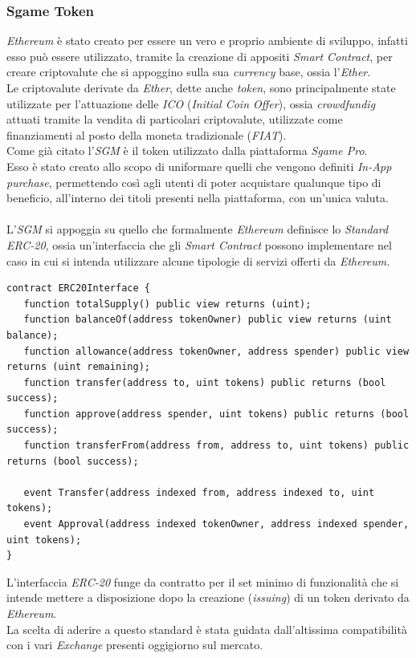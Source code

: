 \documentclass[11pt]{thesistemp}
\begin{document}
\subsubsection{Sgame Token}

\textit{Ethereum} è stato creato per essere un vero e proprio ambiente di sviluppo, infatti esso può essere utilizzato, tramite la creazione di appositi \textit{Smart Contract}, per creare criptovalute che si appoggino sulla sua \textit{currency} base, ossia l'\textit{Ether}.\\
Le criptovalute derivate da \textit{Ether}, dette anche \textit{token}, sono principalmente state utilizzate per l'attuazione delle \textit{ICO} (\textit{Initial Coin Offer}), ossia \textit{crowdfundig} attuati tramite la vendita di particolari criptovalute, utilizzate come finanziamenti al posto della moneta tradizionale (\textit{FIAT}).\\
Come già citato l'\textit{SGM} è il token utilizzato dalla piattaforma \textit{Sgame Pro}.\\
Esso è stato creato allo scopo di uniformare quelli che vengono definiti \textit{In-App purchase}, permettendo così agli utenti di poter acquistare qualunque tipo di beneficio, all'interno dei titoli presenti nella piattaforma, con un'unica valuta.\\\\
L'\textit{SGM} si appoggia su quello che formalmente \textit{Ethereum} definisce lo \textit{Standard ERC-20}, ossia un'interfaccia che gli \textit{Smart Contract} possono implementare nel caso in cui si intenda utilizzare alcune tipologie di servizi offerti da \textit{Ethereum.}
\begin{lstlisting}[language=Solidity]
contract ERC20Interface {
   function totalSupply() public view returns (uint);
   function balanceOf(address tokenOwner) public view returns (uint balance);
   function allowance(address tokenOwner, address spender) public view returns (uint remaining);
   function transfer(address to, uint tokens) public returns (bool success);
   function approve(address spender, uint tokens) public returns (bool success);
   function transferFrom(address from, address to, uint tokens) public returns (bool success);

   event Transfer(address indexed from, address indexed to, uint tokens);
   event Approval(address indexed tokenOwner, address indexed spender, uint tokens);
}
\end{lstlisting}
L'interfaccia \textit{ERC-20} funge da contratto per il set minimo di funzionalità che si intende mettere a disposizione dopo la creazione (\textit{issuing}) di un token derivato da \textit{Ethereum}.\\
La scelta di aderire a questo standard è stata guidata dall'altissima compatibilità con i vari \textit{Exchange} presenti oggigiorno sul mercato.
\end{document}
